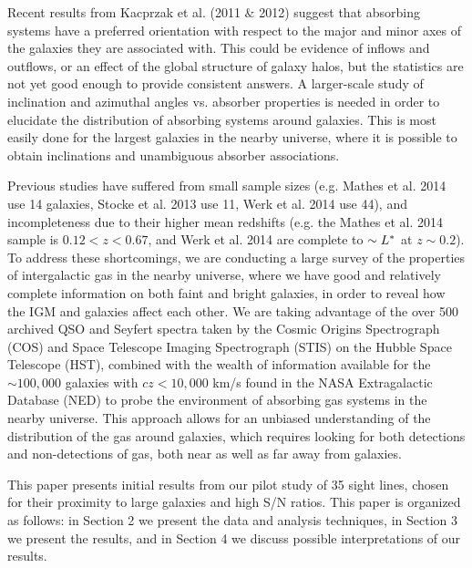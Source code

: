 \documentclass[iop]{emulateapj-rtx4}
\begin{document}


Recent results from Kacprzak et al. (2011 $\&$ 2012) suggest that absorbing systems have a preferred orientation with respect to the major and minor axes of the galaxies they are associated with. This could be evidence of inflows and outflows, or an effect of the global structure of galaxy halos, but the statistics are not yet good enough to provide consistent answers. A larger-scale study of inclination and azimuthal angles vs. absorber properties is needed in order to elucidate the distribution of absorbing systems around galaxies. This is most easily done for the largest galaxies in the nearby universe, where it is possible to obtain inclinations and unambiguous absorber associations. 


Previous studies have suffered from small sample sizes (e.g. Mathes et al. 2014 use 14 galaxies, Stocke et al. 2013 use 11, Werk et al. 2014 use 44), and incompleteness due to their higher mean redshifts (e.g. the Mathes et al. 2014 sample is $0.12 <z<0.67$, and Werk et al. 2014 are complete to $\sim L^{\**}$ at $z\sim0.2$). To address these shortcomings, we are conducting a large survey of the properties of intergalactic gas in the nearby universe, where we have good and relatively complete information on both faint and bright galaxies, in order to reveal how the IGM and galaxies affect each other. We are taking advantage of the over 500 archived QSO and Seyfert spectra taken by the Cosmic Origins Spectrograph (COS) and Space Telescope Imaging Spectrograph (STIS) on the Hubble Space Telescope (HST), combined with the wealth of information available for the $\sim100,000$ galaxies with $cz<10,000$ km/s found in the NASA Extragalactic Database (NED) to probe the environment of absorbing gas systems in the nearby universe. This approach allows for an unbiased understanding of the distribution of the gas around galaxies, which requires looking for both detections and non-detections of gas, both near as well as far away from galaxies.

This paper presents initial results from our pilot study of 35 sight lines, chosen for their proximity to large galaxies and high S/N ratios. This paper is organized as follows: in Section 2 we present the data and analysis techniques, in Section 3 we present the results, and in Section 4 we discuss possible interpretations of our results.
\end{document}
